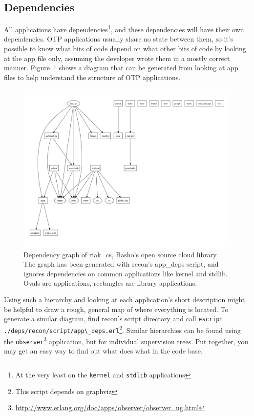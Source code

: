 \documentclass[11pt, oneside]{book}   	%
\newcommand{\module}[1]{\Verb`#1`}
\newcommand{\command}[1]{\Verb`#1`}
\begin{document}
\subsection{Dependencies}
\label{subsec:dive-dependencies}

All applications have dependencies\footnote{At the very least on the \module{kernel} and \module{stdlib} applications}, and these dependencies will have their own dependencies. OTP applications usually share no state between them, so it's possible to know what bits of code depend on what other bits of code by looking at the app file only, assuming the developer wrote them in a mostly correct manner. Figure~\ref{fig:app-deps} shows a diagram that can be generated from looking at app files to help understand the structure of OTP applications.


\begin{figure}
  \includegraphics{app-deps-riak-cs.pdf}%
  \caption{Dependency graph of riak\_cs, Basho's open source cloud library.
  The graph has been generated with recon's app\_deps script, and ignores dependencies on common applications like kernel and stdlib. Ovals are applications, rectangles are library applications.}%
   \label{fig:app-deps}
\end{figure}

Using such a hierarchy and looking at each application's short description might be helpful to draw a rough, general map of where everything is located. To generate a similar diagram, find recon's script directory and call \command{escript ./deps/recon/script/app\_deps.erl}\footnote{This script depends on graphviz}. Similar hierarchies can be found using the \module{observer}\footnote{\href{http://www.erlang.org/doc/apps/observer/observer\_ug.html}{http://www.erlang.org/doc/apps/observer/observer\_ug.html}} application, but for individual supervision trees. Put together, you may get an easy way to find out what does what in the code base.
\end{document}
